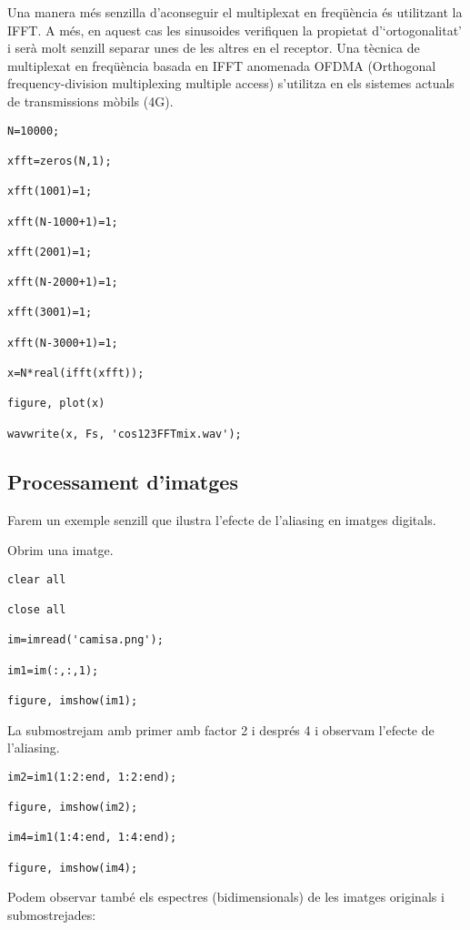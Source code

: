 \documentclass{article}
\begin{document}
Una manera més senzilla d'aconseguir el multiplexat en freqüència és utilitzant la IFFT.
A més, en aquest cas les sinusoides verifiquen la propietat
d'`ortogonalitat' i serà molt senzill separar unes de les altres en el receptor.
Una tècnica de multiplexat en freqüència basada en IFFT anomenada OFDMA
(Orthogonal frequency-division multiplexing multiple access) s'utilitza en els sistemes actuals de transmissions
mòbils (4G).


\begin{verbatim}
N=10000;

xfft=zeros(N,1);

xfft(1001)=1;

xfft(N-1000+1)=1;

xfft(2001)=1;

xfft(N-2000+1)=1;

xfft(3001)=1;

xfft(N-3000+1)=1;

x=N*real(ifft(xfft));

figure, plot(x)

wavwrite(x, Fs, 'cos123FFTmix.wav');
\end{verbatim}



\subsection{Processament d'imatges}

Farem un exemple senzill que ilustra l'efecte de l'aliasing en imatges digitals.

Obrim una imatge.
\begin{verbatim}
clear all

close all

im=imread('camisa.png');

im1=im(:,:,1);

figure, imshow(im1);
\end{verbatim}

La submostrejam amb primer amb factor 2 i després 4 i observam l'efecte de l'aliasing.

\begin{verbatim}
im2=im1(1:2:end, 1:2:end);

figure, imshow(im2);

im4=im1(1:4:end, 1:4:end);

figure, imshow(im4);
\end{verbatim}

Podem observar també els espectres (bidimensionals) de les imatges originals i submostrejades:
\end{document}
